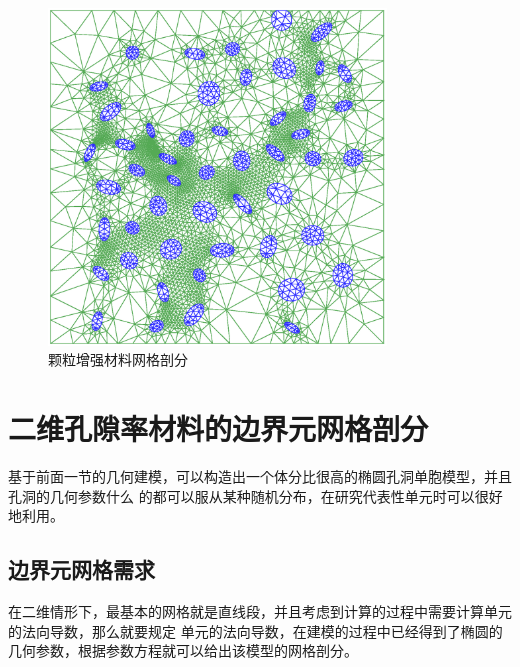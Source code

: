 \begin{figure}[htbp]
	\begin{center}
		\includegraphics[width=0.8\textwidth]{pics/fem_ellipse_grain_mesh.eps}
	\end{center}
	\caption{颗粒增强材料网格剖分}
	\label{fig_ellipsemesh_grain}
\end{figure}

\section{二维孔隙率材料的边界元网格剖分}
基于前面一节的几何建模，可以构造出一个体分比很高的椭圆孔洞单胞模型，并且孔洞的几何参数什么
的都可以服从某种随机分布，在研究代表性单元时可以很好地利用。

\subsection{边界元网格需求}
在二维情形下，最基本的网格就是直线段，并且考虑到计算的过程中需要计算单元的法向导数，那么就要规定
单元的法向导数，在建模的过程中已经得到了椭圆的几何参数，根据参数方程就可以给出该模型的网格剖分。

